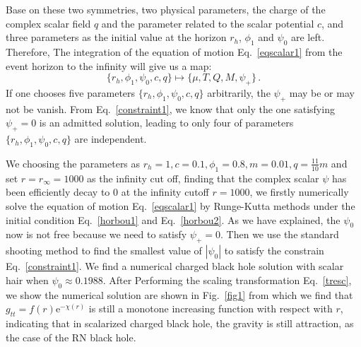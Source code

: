 \documentclass[pr, twocolumn, preprintnumbers, showpacs,footnoteadded, superscriptaddress,nofootinbib,longbibliography]{revtex4-1}
\newcommand{\te}{\mathrm{e}}
\begin{document}
Base on these two symmetries, two physical parameters, the charge of the complex scalar field $q$ and the parameter related to the scalar potential $c$, and three parameters as the initial value at the horizon $r_h$, $\phi_1$ and $\psi_0$ are left. Therefore, The integration of the equation of motion Eq.~\eqref{eqscalar1} from the event horizon to the infinity will give us a map:
%
\begin{equation} \label{map1}
\{r_h, \phi_1, \psi_0 , c, q \} \mapsto \{\mu, T, Q, M, \psi_+ \}\, .
\end{equation}
%
If one chooses five parameters $\{r_h, \phi_1, \psi_0 , c, q \}$ arbitrarily, the $\psi_+$ may be or may not be vanish. From Eq.~\eqref{constraint1}, we know that only the one satisfying $\psi_+=0$ is an admitted solution, leading to only four of parameters $\{r_h, \phi_1, \psi_0 , c, q \}$ are independent.


We choosing the parameters as $r_h=1, c=0.1, \phi_1=0.8, m=0.01, q=\frac{11}{10}m$ and set $r=r_{\infty}=1000$ as the infinity cut off, finding that the complex scalar $\psi$ has been efficiently decay to $0$ at the infinity cutoff $r = 1000$, we firstly numerically solve the equation of motion Eq.~\eqref{eqscalar1} by Runge-Kutta methods under the initial condition Eq.~\eqref{horbou1} and Eq.~\eqref{horbou2}. As we have explained, the $\psi_0$ now is not free because we need to satisfy $\psi_+=0$. Then we use the standard shooting method to find the smallest value of $|\psi_0|$ to satisfy the constrain Eq.~\eqref{constraint1}. We find a numerical charged black hole solution with scalar hair when $\psi_0\approx0.1988$. After Performing the scaling transformation Eq.~\eqref{tresc}, we show the numerical solution are shown in Fig.~\ref{fig1} from which we find that $g_{tt}=f(r)\te^{-\chi(r)}$ is still a monotone increasing function with respect with $r$, indicating that in scalarized charged black hole, the gravity is still attraction, as the case of the RN black hole.
\end{document}
